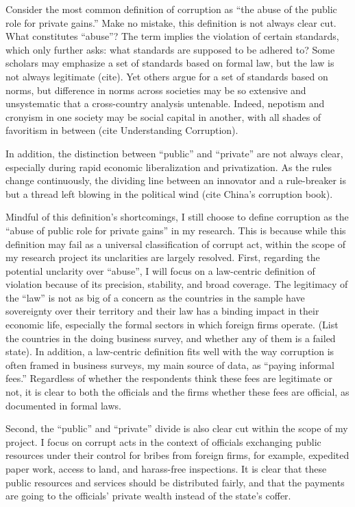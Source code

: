 Consider the most common definition of corruption as ``the abuse of the public role for private gains.'' Make no mistake, this definition is not always clear cut. What constitutes ``abuse''? The term implies the violation of certain standards, which only further asks: what standards are supposed to be adhered to? Some scholars may emphasize a set of standards based on formal law, but the law is not always legitimate (cite). Yet others argue for a set of standards based on norms, but difference in norms across societies may be so extensive and unsystematic that a cross-country analysis untenable. Indeed, nepotism and cronyism in one society may be social capital in another, with all shades of favoritism in between (cite Understanding Corruption). 

In addition, the distinction between ``public'' and ``private'' are not always clear, especially during rapid economic liberalization and privatization. As the rules change continuously, the dividing line between an innovator and a rule-breaker is but a thread left blowing in the political wind (cite China's corruption book).

Mindful of this definition's shortcomings, I still choose to define corruption as the ``abuse of public role for private gains'' in my research. This is because while this definition may fail as a universal classification of corrupt act, within the scope of my research project its unclarities are largely resolved. First, regarding the potential unclarity over ``abuse'', I will focus on a law-centric definition of violation because of its precision, stability, and broad coverage. The legitimacy of the ``law'' is not as big of a concern as the countries in the sample have sovereignty over their territory and their law has a binding impact in their economic life, especially the formal sectors in which foreign firms operate. (List the countries in the doing business survey, and whether any of them is a failed state). In addition, a law-centric definition fits well with the way corruption is often framed in business surveys, my main source of data, as ``paying informal fees.'' Regardless of whether the respondents think these fees are legitimate or not, it is clear to both the officials and the firms whether these fees are official, as documented in formal laws.

Second, the ``public'' and ``private'' divide is also clear cut within the scope of my project. I focus on corrupt acts in the context of officials exchanging public resources under their control for bribes from foreign firms, for example, expedited paper work, access to land, and harass-free inspections. It is clear that these public resources and services should be distributed fairly, and that the payments are going to the officials' private wealth instead of the state's coffer.

